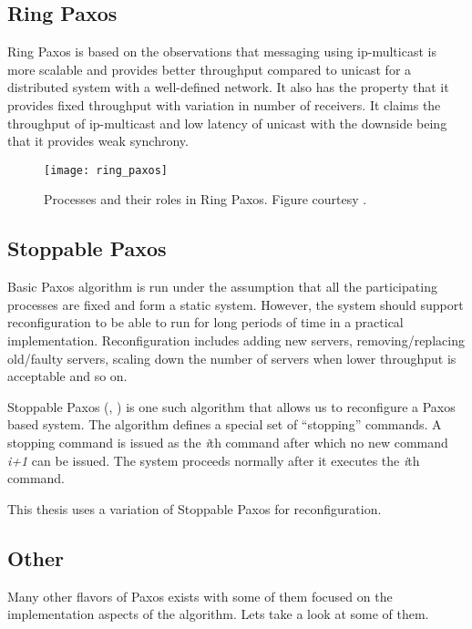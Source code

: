 \subsection{Ring Paxos}

Ring Paxos \citep{MarandiPSP10} is based on the observations that messaging
using ip-multicast is more scalable and provides better throughput compared
to unicast for a distributed system with a well-defined network. It also
has the property that it provides fixed throughput with variation in number
of receivers. It claims the throughput of ip-multicast and low latency of
unicast with the downside being that it provides weak synchrony.

\begin{figure}
  \texttt{[image: ring\_paxos]}
  \caption[Ring Paxos]{%
  Processes and their roles in Ring Paxos. Figure courtesy 
  \citep{MarandiPSP10}.}
  \label{figure:ring.paxos}
\end{figure}

\subsection{Stoppable Paxos}

Basic Paxos algorithm is run under the assumption that all the participating
processes are fixed and form a static system. However, the system should
support reconfiguration to be able to run for long periods of time in a
practical implementation. Reconfiguration includes adding new servers, 
removing/replacing old/faulty servers, scaling down the number of servers
when lower throughput is acceptable and so on.

Stoppable Paxos (\citet{LamportSP08}, \citet{LamportMZ10}) is one such algorithm
that allows us to reconfigure a Paxos based system. The algorithm defines a
special set of ``stopping'' commands. A stopping command is issued as the
\emph{i}th command after which no new command \emph{i+1} can be issued. The 
system proceeds normally after it executes the \emph{i}th command.

This thesis uses a variation of Stoppable Paxos for reconfiguration.

\subsection{Other}

Many other flavors of Paxos exists with some of them focused on the
implementation aspects of the algorithm. Lets take a look at some of them.

